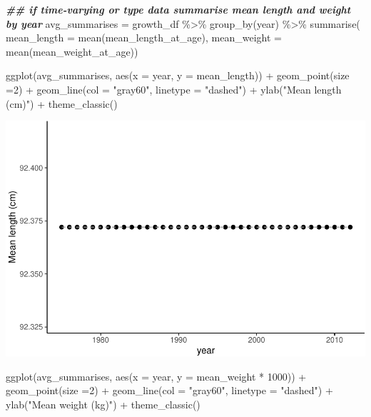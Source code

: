 \documentclass[
]{book}
\newenvironment{Shaded}{\begin{snugshade}}{\end{snugshade}}
\newcommand{\AttributeTok}[1]{\textcolor[rgb]{0.77,0.63,0.00}{#1}}
\newcommand{\DecValTok}[1]{\textcolor[rgb]{0.00,0.00,0.81}{#1}}
\newcommand{\DocumentationTok}[1]{\textcolor[rgb]{0.56,0.35,0.01}{\textbf{\textit{#1}}}}
\newcommand{\FunctionTok}[1]{\textcolor[rgb]{0.00,0.00,0.00}{#1}}
\newcommand{\NormalTok}[1]{#1}
\newcommand{\OtherTok}[1]{\textcolor[rgb]{0.56,0.35,0.01}{#1}}
\newcommand{\SpecialCharTok}[1]{\textcolor[rgb]{0.00,0.00,0.00}{#1}}
\newcommand{\StringTok}[1]{\textcolor[rgb]{0.31,0.60,0.02}{#1}}
\begin{document}
\begin{Shaded}
\begin{Highlighting}[]
\DocumentationTok{\#\# if time{-}varying or type data summarise mean length and weight by year}
\NormalTok{avg\_summarises }\OtherTok{=}\NormalTok{ growth\_df }\SpecialCharTok{\%\textgreater{}\%} \FunctionTok{group\_by}\NormalTok{(year) }\SpecialCharTok{\%\textgreater{}\%} \FunctionTok{summarise}\NormalTok{(}
  \AttributeTok{mean\_length =} \FunctionTok{mean}\NormalTok{(mean\_length\_at\_age), }
  \AttributeTok{mean\_weight =} \FunctionTok{mean}\NormalTok{(mean\_weight\_at\_age))}

\FunctionTok{ggplot}\NormalTok{(avg\_summarises, }\FunctionTok{aes}\NormalTok{(}\AttributeTok{x =}\NormalTok{ year, }\AttributeTok{y =}\NormalTok{ mean\_length)) }\SpecialCharTok{+}
  \FunctionTok{geom\_point}\NormalTok{(}\AttributeTok{size =}\DecValTok{2}\NormalTok{) }\SpecialCharTok{+}
  \FunctionTok{geom\_line}\NormalTok{(}\AttributeTok{col =} \StringTok{"gray60"}\NormalTok{, }\AttributeTok{linetype =} \StringTok{"dashed"}\NormalTok{) }\SpecialCharTok{+}
  \FunctionTok{ylab}\NormalTok{(}\StringTok{"Mean length (cm)"}\NormalTok{) }\SpecialCharTok{+}
  \FunctionTok{theme\_classic}\NormalTok{()}
\end{Highlighting}
\end{Shaded}

\includegraphics{_main_files/figure-latex/growth_df-1.pdf}

\begin{Shaded}
\begin{Highlighting}[]
\FunctionTok{ggplot}\NormalTok{(avg\_summarises, }\FunctionTok{aes}\NormalTok{(}\AttributeTok{x =}\NormalTok{ year, }\AttributeTok{y =}\NormalTok{ mean\_weight }\SpecialCharTok{*} \DecValTok{1000}\NormalTok{)) }\SpecialCharTok{+}
  \FunctionTok{geom\_point}\NormalTok{(}\AttributeTok{size =}\DecValTok{2}\NormalTok{) }\SpecialCharTok{+}
  \FunctionTok{geom\_line}\NormalTok{(}\AttributeTok{col =} \StringTok{"gray60"}\NormalTok{, }\AttributeTok{linetype =} \StringTok{"dashed"}\NormalTok{) }\SpecialCharTok{+}
  \FunctionTok{ylab}\NormalTok{(}\StringTok{"Mean weight (kg)"}\NormalTok{) }\SpecialCharTok{+}
  \FunctionTok{theme\_classic}\NormalTok{() }
\end{Highlighting}
\end{Shaded}
\end{document}
